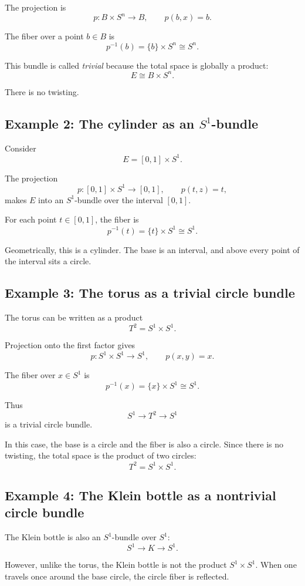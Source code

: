 \documentclass[12pt,a4paper]{article}
\theoremstyle{notespace}
\begin{document}
The projection is
\[
p:B\times S^n\to B,
\qquad
p(b,x)=b.
\]

The fiber over a point \(b\in B\) is
\[
p^{-1}(b)=\{b\}\times S^n\cong S^n.
\]

This bundle is called \emph{trivial} because the total space is globally a product:
\[
E\cong B\times S^n.
\]

There is no twisting.

\subsection{Example 2: The cylinder as an \(S^1\)-bundle}

Consider
\[
E=[0,1]\times S^1.
\]

The projection
\[
p:[0,1]\times S^1\to [0,1],
\qquad
p(t,z)=t,
\]
makes \(E\) into an \(S^1\)-bundle over the interval \([0,1]\).

For each point \(t\in[0,1]\), the fiber is
\[
p^{-1}(t)=\{t\}\times S^1\cong S^1.
\]

Geometrically, this is a cylinder. The base is an interval, and above every point of the interval sits a circle.

\subsection{Example 3: The torus as a trivial circle bundle}

The torus can be written as a product
\[
T^2=S^1\times S^1.
\]

Projection onto the first factor gives
\[
p:S^1\times S^1\to S^1,
\qquad
p(x,y)=x.
\]

The fiber over \(x\in S^1\) is
\[
p^{-1}(x)=\{x\}\times S^1\cong S^1.
\]

Thus
\[
S^1\longrightarrow T^2\longrightarrow S^1
\]
is a trivial circle bundle.

In this case, the base is a circle and the fiber is also a circle. Since there is no twisting, the total space is the product of two circles:
\[
T^2=S^1\times S^1.
\]

\subsection{Example 4: The Klein bottle as a nontrivial circle bundle}

The Klein bottle is also an \(S^1\)-bundle over \(S^1\):
\[
S^1\longrightarrow K\longrightarrow S^1.
\]

However, unlike the torus, the Klein bottle is not the product \(S^1\times S^1\). When one travels once around the base circle, the circle fiber is reflected.
\end{document}
